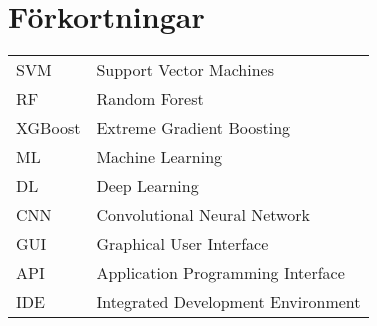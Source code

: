 \documentclass[12pt,a4paper]{article}
\begin{document}
\section*{Förkortningar}
\begin{tabular}{ll}
    SVM & Support Vector Machines \\
    RF & Random Forest \\
    XGBoost & Extreme Gradient Boosting \\
    ML & Machine Learning \\
    DL & Deep Learning \\
    CNN & Convolutional Neural Network \\
    GUI & Graphical User Interface \\
    API & Application Programming Interface \\
    IDE & Integrated Development Environment \\

\end{tabular}

\newpage

\listoffigures

\newpage

\listoftables

\newpage

\newpage
\tableofcontents
\end{document}
